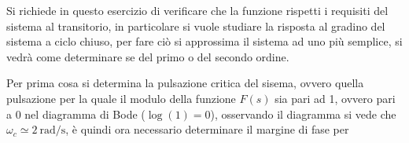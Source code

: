 Si richiede in questo esercizio di verificare che la funzione rispetti i requisiti del sistema al transitorio, in particolare si vuole studiare la risposta
al gradino del sistema a ciclo chiuso, per fare ciò si approssima il sistema ad
uno più semplice, si vedrà come determinare se del primo o del secondo ordine.

Per prima cosa si determina la pulsazione critica del sisema, ovvero quella
pulsazione per la quale il modulo della funzione $F(s)$ sia pari ad 1, ovvero pari a 0 nel diagramma di Bode ($\log(1)=0$), osservando il diagramma si vede che
$\omega_c \simeq \SI{2}{\radian/\second}$, è quindi ora necessario determinare il margine di
fase per



